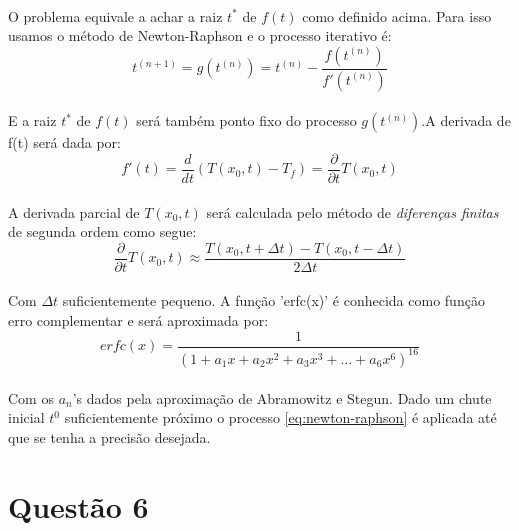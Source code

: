 \documentclass[a4paper,11pt]{article}
\begin{document}
\paragraph{}O problema equivale a achar a raiz $t^*$ de $f(t)$ como definido acima. Para isso usamos o método de Newton-Raphson e o processo iterativo é:
\begin{equation}
	t^{(n+1)} = g(t^{(n)}) = t^{(n)} - \frac{f(t^{(n)})}{f'(t^{(n)})}
	\label{eq:newton-raphson}
\end{equation}
\paragraph{}E a raiz $t^*$ de $f(t)$ será também ponto fixo do processo $g(t^{(n)})$.A derivada de f(t) será dada por:
\begin{displaymath}
	f'(t) = \frac{d}{dt} \left( T(x_0, t) - T_f \right) = \frac{\partial}{\partial t} T(x_0, t)
\end{displaymath}

\paragraph{}A derivada parcial de $T(x_0, t)$ será calculada pelo método de \emph{diferenças finitas} de segunda ordem como segue:
\begin{displaymath}
	\frac{\partial}{\partial t} T(x_0, t) \approx \frac{T(x_0, t + \Delta t) - T(x_0, t - \Delta t) }{2 \Delta t}
\end{displaymath}
\paragraph{}Com $\Delta t$ suficientemente pequeno. A função 'erfc(x)' é conhecida como função erro complementar e será aproximada por:
\begin{equation}
	erfc(x) = \frac{1}{(1 + a_1 x + a_2 x^2 + a_3 x^3 + \ldots + a_6 x^6)^{16}}
\end{equation}
\paragraph{}Com os $a_n$'s dados pela aproximação de Abramowitz e Stegun. Dado um chute inicial $t^0$ suficientemente próximo o processo \ref{eq:newton-raphson} é aplicada até que se tenha a precisão desejada.

\section*{Questão 6}
\end{document}
